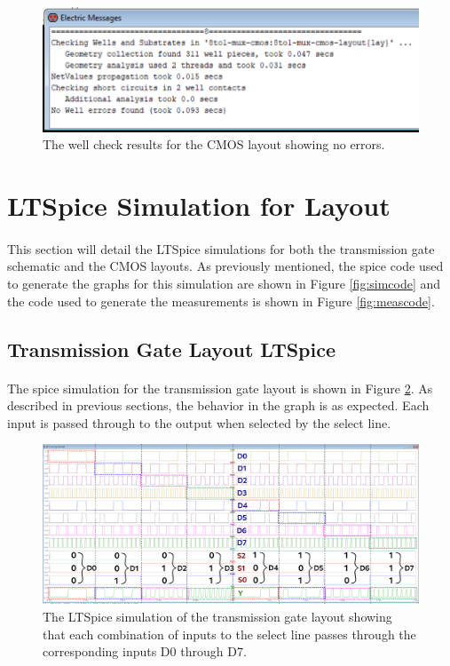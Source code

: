 \documentclass{article}
\begin{document}
    \begin{figure}[H]
      \centering
      \includegraphics[width=0.6\linewidth, frame]{screenshots/cmos/lay/well.png}
      \caption{The well check results for the CMOS layout showing no errors.}
      \label{fig:cmoslaywell}
    \end{figure}


\section{LTSpice Simulation for Layout}
  \paragraph{}
  This section will detail the LTSpice simulations for both the transmission gate schematic and the CMOS layouts. As previously mentioned, the spice code used to generate the graphs for this simulation are shown in Figure \ref{fig:simcode} and the code used to generate the measurements is shown in Figure \ref{fig:meascode}.


  \subsection{Transmission Gate Layout LTSpice}
    \paragraph{}
    The spice simulation for the transmission gate layout is shown in Figure \ref{fig:tglayspice}. As described in previous sections, the behavior in the graph is as expected. Each input is passed through to the output when selected by the select line.

    \begin{figure}[H]
      \centering
      \includegraphics[width=\linewidth, frame]{screenshots/tg/lay/spice.png}
      \caption{The LTSpice simulation of the transmission gate layout showing that each combination of inputs to the select line passes through the corresponding inputs D0 through D7.}
      \label{fig:tglayspice}
    \end{figure}
\end{document}
